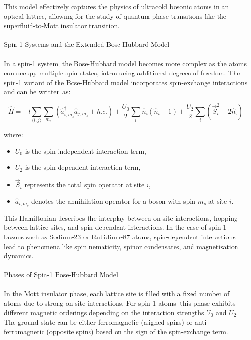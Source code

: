 This model effectively captures the physics of ultracold bosonic atoms in an optical lattice, allowing for the study of quantum phase transitions like the superfluid-to-Mott insulator transition. \\ \\
\textcolor{myred}{Spin-1 Systems and the Extended Bose-Hubbard Model}\\ \\


In a spin-1 system, the Bose-Hubbard model becomes more complex as the atoms can occupy multiple spin states, introducing additional degrees of freedom. The spin-1 variant of the Bose-Hubbard model incorporates spin-exchange interactions and can be written as:

\begin{equation}
\hat{H} = -t \sum_{\langle i,j \rangle} \sum_{m_s} (\hat{a}_{i,m_s}^\dagger \hat{a}_{j,m_s} + h.c.) + \frac{U_0}{2} \sum_{i} \hat{n}_i (\hat{n}_i - 1) + \frac{U_2}{2} \sum_i \left( \vec{S}_i^2 - 2 \hat{n}_i \right)
\end{equation}

where:
\begin{itemize}
    \item $U_0$ is the spin-independent interaction term,
    \item $U_2$ is the spin-dependent interaction term,
    \item $\vec{S}_i$ represents the total spin operator at site $i$,
    \item $\hat{a}_{i,m_s}$ denotes the annihilation operator for a boson with spin $m_s$ at site $i$.
\end{itemize}

This Hamiltonian describes the interplay between on-site interactions, hopping between lattice sites, and spin-dependent interactions. In the case of spin-1 bosons such as Sodium-23 or Rubidium-87 atoms, spin-dependent interactions lead to phenomena like spin nematicity, spinor condensates, and magnetization dynamics.\\ \\
\textcolor{myred}{Phases of Spin-1 Bose-Hubbard Model}\\ \\
In the Mott insulator phase, each lattice site is filled with a fixed number of atoms due to strong on-site interactions. For spin-1 atoms, this phase exhibits different magnetic orderings depending on the interaction strengths $U_0$ and $U_2$. The ground state can be either ferromagnetic (aligned spins) or anti-ferromagnetic (opposite spins) based on the sign of the spin-exchange term.

